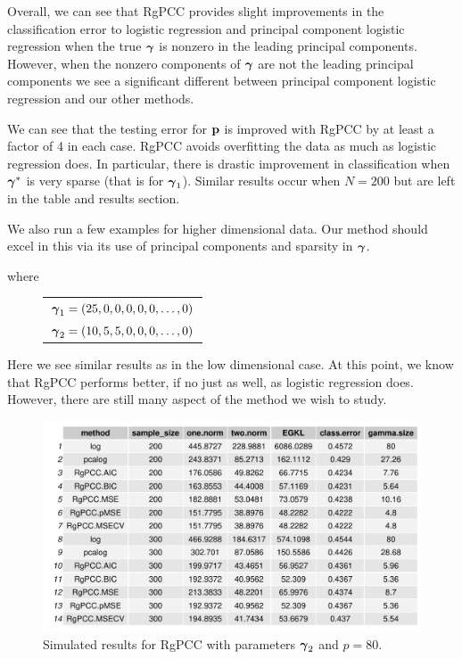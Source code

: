 \documentclass[main.tex]{subfiles}
\begin{document}
Overall, we can see that RgPCC provides slight improvements in the classification error to logistic regression and principal component logistic regression when the true $\boldsymbol \gamma$ is nonzero in the leading principal components. However, when the nonzero components of $\boldsymbol \gamma$ are not the leading principal components we see a significant different between principal component logistic regression and our other methods.

We can see that the testing error for $\mathbf{p}$ is improved with RgPCC by at least a factor of 4 in each case. RgPCC avoids overfitting the data as much as logistic regression does. In particular, there is drastic improvement in classification when $\boldsymbol \gamma^*$ is very sparse (that is for $\boldsymbol \gamma_1$). Similar results occur when $N = 200$ but are left in the table and results section.

We also run a few examples for higher dimensional data. Our method should excel in this via its use of principal components and sparsity in $\boldsymbol \gamma$.

where

\begin{figure}[H]
	\begin{tabular}{l}
		$\boldsymbol \gamma_1 = (25, 0, 0, 0, 0, 0, \ldots , 0)$ \\
		$\boldsymbol \gamma_2 = (10, 5, 5, 0, 0, 0, \ldots , 0)$
	\end{tabular}
\end{figure}

Here we see similar results as in the low dimensional case. At this point, we know that RgPCC performs better, if no just as well, as logistic regression does. However, there are still many aspect of the method we wish to study.

\begin{figure}[H]
	\centering
	\includegraphics[width =  \textwidth]{simulated/(sparsity3,80)_metrics.pdf}
	\caption{Simulated results for RgPCC with parameters $\boldsymbol \gamma_2$ and $p = 80$.}
	\label{fig:simulated2-80}
\end{figure}
\end{document}
